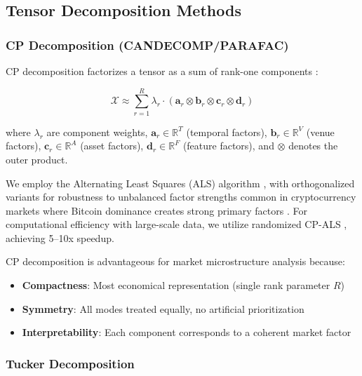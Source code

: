 \documentclass[11pt,twocolumn]{article}
\begin{document}
\subsection{Tensor Decomposition Methods}

\subsubsection{CP Decomposition (CANDECOMP/PARAFAC)}

CP decomposition factorizes a tensor as a sum of rank-one components \citep{Kolda2009Tensor,Han2022CP}:

\begin{equation}
\mathcal{X} \approx \sum_{r=1}^{R} \lambda_r \cdot (\mathbf{a}_r \otimes \mathbf{b}_r \otimes \mathbf{c}_r \otimes \mathbf{d}_r)
\label{eq:cp}
\end{equation}

where $\lambda_r$ are component weights, $\mathbf{a}_r \in \mathbb{R}^T$ (temporal factors), $\mathbf{b}_r \in \mathbb{R}^V$ (venue factors), $\mathbf{c}_r \in \mathbb{R}^A$ (asset factors), $\mathbf{d}_r \in \mathbb{R}^F$ (feature factors), and $\otimes$ denotes the outer product.

We employ the Alternating Least Squares (ALS) algorithm \citep{Kolda2009Tensor}, with orthogonalized variants for robustness to unbalanced factor strengths common in cryptocurrency markets where Bitcoin dominance creates strong primary factors \citep{AnandkumarOrthoALS}. For computational efficiency with large-scale data, we utilize randomized CP-ALS \citep{Battaglino2018Practical}, achieving 5--10x speedup.

CP decomposition is advantageous for market microstructure analysis because:

\begin{itemize}[leftmargin=*]
    \item \textbf{Compactness}: Most economical representation (single rank parameter $R$)
    \item \textbf{Symmetry}: All modes treated equally, no artificial prioritization
    \item \textbf{Interpretability}: Each component corresponds to a coherent market factor
\end{itemize}

\subsubsection{Tucker Decomposition}
\end{document}
